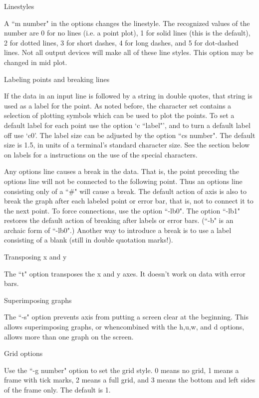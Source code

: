  Linestyles


A ``m number" in the options changes the linestyle.  The recognized
values of the number are 0 for no lines (i.e. a point plot), 1 for
solid lines (this is the default), 2 for dotted lines, 3 for short
dashes, 4 for long dashes, and 5 for dot-dashed lines.  Not all output
devices will make all of these line styles.  This option may be 
changed in mid plot.

 Labeling points and breaking lines

If the data in an input line is followed by a string in double quotes,
that string is used as a label for the point.  As noted before, the
character set contains a selection of plotting symbols which can be
used to plot the points.  To set a default label for each point
use the option `c ``label"', and to turn a default label off
use `c0'.  The label size can be adjusted by the option
``cs number".  The default size is 1.5, in units of a terminal's
standard character size.  See the section below on labels for a
instructions on the use of the special characters.

Any options line causes a break in the data.  That is, the point preceding
the options line will not be connected to the following point.
Thus an options line consisting only of a ``\#" will cause a break.
The default action of axis is also to break the graph after each labeled
point or error bar, that is, not to connect it to the next point.  To force
connections, use the option ``-lb0".
The option ``-lb1" restores the default action of breaking after labels
or error bars.  (``-b" is an archaic form of ``-lb0".)
Another way to introduce a break is to use a label consisting of a blank
(still in double quotation marks!).

 Transposing x and y

The ``t" option transposes the x and y axes.  It doesn't work on
data with error bars.

 Superimposing graphs

The ``-s" option prevents axis from putting a screen clear at the
beginning.
This allows superimposing graphs, or whencombined with the h,u,w, and
d options, allows more than one graph on the screen.

 Grid options

Use the ``-g number" option to set the grid style. 0 means no grid,
1 means a frame with tick marks, 2 means a full grid, and 3 means
the bottom and left sides of the frame only.  The default
is 1.

